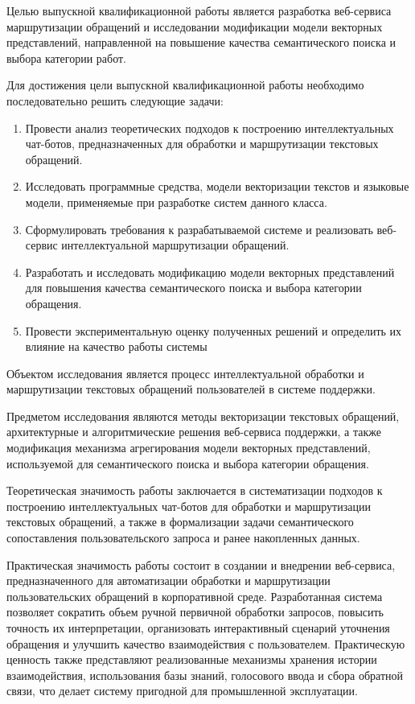 \documentclass[14pt,a4paper]{extarticle}
\renewcommand{\textbf}[1]{#1}
\numberwithin{figure}{section}
\numberwithin{table}{section}
\begin{document}
Целью выпускной квалификационной работы является разработка веб-сервиса
маршрутизации обращений и исследовании модификации модели векторных представлений,
направленной на повышение качества семантического поиска и выбора
категории работ.

Для достижения цели выпускной квалификационной работы необходимо
последовательно решить \textbf{следующие задачи}:

\begin{enumerate}
\def\labelenumi{\arabic{enumi}.}
\item Провести анализ теоретических подходов к построению интеллектуальных
  чат-ботов, предназначенных для обработки и маршрутизации текстовых
  обращений.
\item Исследовать программные средства, модели векторизации текстов и
  языковые модели, применяемые при разработке систем данного класса.
\item Сформулировать требования к разрабатываемой системе и реализовать
  веб-сервис интеллектуальной маршрутизации обращений.
\item Разработать и исследовать модификацию модели векторных представлений для повышения
  качества семантического поиска и выбора категории обращения.
\item Провести экспериментальную оценку полученных решений и определить их
  влияние на качество работы системы

\end{enumerate}

Объектом исследования является процесс интеллектуальной обработки и
маршрутизации текстовых обращений пользователей в системе поддержки.

\textbf{Предметом исследования} являются методы векторизации текстовых
обращений, архитектурные и алгоритмические решения веб-сервиса
поддержки, а также модификация механизма агрегирования модели векторных представлений,
используемой для семантического поиска и выбора категории обращения.

Теоретическая значимость работы заключается в систематизации подходов к
построению интеллектуальных чат-ботов для обработки и маршрутизации
текстовых обращений, а также в формализации задачи семантического
сопоставления пользовательского запроса и ранее накопленных данных.

Практическая значимость работы состоит в создании и внедрении
веб-сервиса, предназначенного для автоматизации обработки и
маршрутизации пользовательских обращений в корпоративной среде.
Разработанная система позволяет сократить объем ручной первичной
обработки запросов, повысить точность их интерпретации, организовать
интерактивный сценарий уточнения обращения и улучшить качество
взаимодействия с пользователем. Практическую ценность также представляют
реализованные механизмы хранения истории взаимодействия, использования
базы знаний, голосового ввода и сбора обратной связи, что делает систему
пригодной для промышленной эксплуатации.
\end{document}
